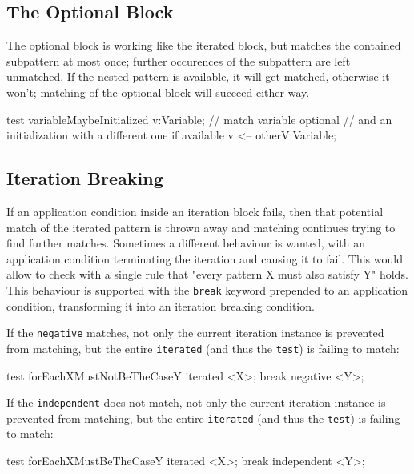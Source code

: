 \subsection*{The Optional Block}
The optional block is working like the iterated block, but matches the contained subpattern at most once; further occurences of the subpattern are left unmatched.
If the nested pattern is available, it will get matched, otherwise it won't; matching of the optional block will succeed either way.

\begin{example}
  \begin{grgen}
test variableMaybeInitialized
{
  v:Variable; // match variable
  optional { // and an initialization with a different one if available
    v <-- otherV:Variable;
  }
}
  \end{grgen}
\end{example}

\subsection*{Iteration Breaking} 
If an application condition inside an iteration block fails, then that potential match of the iterated pattern is thrown away and matching continues trying to find further matches.
Sometimes a different behaviour is wanted, with an application condition terminating the iteration and causing it to fail.
This would allow to check with a single rule that "every pattern X must also satisfy Y" holds.
This behaviour is supported with the \texttt{break} keyword prepended to an application condition, transforming it into an iteration breaking condition.

\begin{example}
If the \texttt{negative} matches, not only the current iteration instance is prevented from matching, but the entire \texttt{iterated} (and thus the \texttt{test}) is failing to match:
  \begin{grgen}
test forEachXMustNotBeTheCaseY
{
  iterated {
    <X>;
    break negative { 
      <Y>;
    }
  }
}
  \end{grgen}

If the \texttt{independent} does not match, not only the current iteration instance is prevented from matching, but the entire \texttt{iterated} (and thus the \texttt{test}) is failing to match:
  \begin{grgen}
test forEachXMustBeTheCaseY
{
  iterated {
    <X>;
    break independent { 
      <Y>;
    }
  }
}
  \end{grgen}
\end{example}

